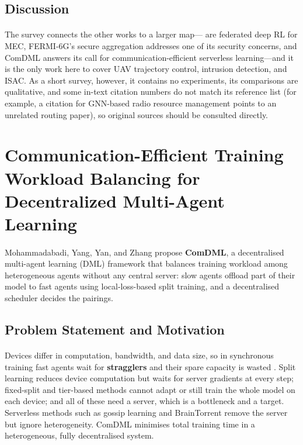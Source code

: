 \documentclass[12pt,a4paper,final]{extreport}
\begin{document}
\subsection{Discussion}

\paragraph{} The survey connects the other works to a larger map---\cite{p1,p2} are federated deep RL for MEC, FERMI-6G's secure aggregation addresses one of its security concerns, and ComDML \cite{p4} answers its call for communication-efficient serverless learning---and it is the only work here to cover UAV trajectory control, intrusion detection, and ISAC. As a short survey, however, it contains no experiments, its comparisons are qualitative, and some in-text citation numbers do not match its reference list (for example, a citation for GNN-based radio resource management points to an unrelated routing paper), so original sources should be consulted directly.

\section{Communication-Efficient Training Workload Balancing for Decentralized Multi-Agent Learning}

\paragraph{} Mohammadabadi, Yang, Yan, and Zhang \cite{p4} propose \textbf{ComDML}, a decentralised multi-agent learning (DML) framework that balances training workload among heterogeneous agents without any central server: slow agents offload part of their model to fast agents using local-loss-based split training, and a decentralised scheduler decides the pairings.

\subsection{Problem Statement and Motivation}

\paragraph{} Devices differ in computation, bandwidth, and data size, so in synchronous training fast agents wait for \textbf{stragglers} and their spare capacity is wasted \cite{p4}. Split learning reduces device computation but waits for server gradients at every step; fixed-split and tier-based methods cannot adapt or still train the whole model on each device; and all of these need a server, which is a bottleneck and a target. Serverless methods such as gossip learning and BrainTorrent remove the server but ignore heterogeneity. ComDML minimises total training time in a heterogeneous, fully decentralised system.
\end{document}
